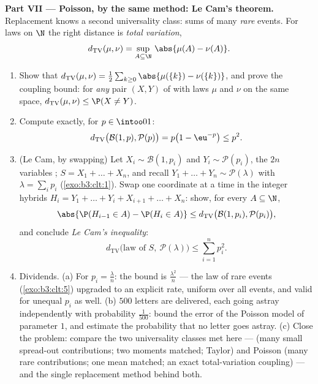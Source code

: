 \begin{problem}
\medskip
\noindent\textbf{Part VII --- Poisson, by the same method:
Le Cam's theorem.} Replacement knows a second universality
class: sums of many  \emph{rare} events. For
laws on $\N$ the right distance is \emph{total variation},
\[
d_{\mathrm{TV}}(\mu, \nu) = \sup_{A\subseteq\N}\,
\abs{\mu(A) - \nu(A)} .
\]
\begin{enumerate}[resume]
  \item Show that $d_{\mathrm{TV}}(\mu, \nu) =
        \frac12\sum_{k\geq0}\abs{\mu(\{k\}) -
        \nu(\{k\})}$, and prove the coupling bound: for
        \emph{any} pair $(X, Y)$ of  with
        laws $\mu$ and $\nu$ on the same space,
        $d_{\mathrm{TV}}(\mu, \nu) \leq \P(X \neq Y)$.
  \item Compute exactly, for $p \in \intoo01$:
        \[
        d_{\mathrm{TV}}\bigl(\mathcal B(1, p), \mathcal
        P(p)\bigr) = p\bigl(1 - \eu^{-p}\bigr) \leq p^2 .
        \]
  \item (Le Cam, by swapping) Let $X_i \sim \mathcal B(1,
        p_i)$ and $Y_i \sim \mathcal P(p_i)$, the $2n$
        variables ; $S = X_1 + \dots + X_n$, and
        recall $Y_1 + \dots + Y_n \sim \mathcal P(\lambda)$
        with $\lambda = \sum_ip_i$ (\cref{exo:b3:clt:1}).
        Swap one coordinate at a time in the integer
        hybrids $H_i = Y_1 + \dots + Y_i + X_{i+1} + \dots
        + X_n$: show, for every $A \subseteq \N$,
        \[
        \abs{\P(H_{i-1} \in A) - \P(H_i \in A)} \leq
        d_{\mathrm{TV}}\bigl(\mathcal B(1, p_i), \mathcal
        P(p_i)\bigr),
        \]
        and conclude \emph{Le Cam's inequality}:
        \[
        d_{\mathrm{TV}}\bigl(\text{law of } S,\ \mathcal
        P(\lambda)\bigr) \leq \sum_{i=1}^np_i^2 .
        \]
  \item Dividends. (a) For $p_i = \frac\lambda n$: the
        bound is $\frac{\lambda^2}n$ --- the law of rare
        events (\cref{exo:b3:clt:5}) upgraded to an
        explicit rate, uniform over all events, and valid
        for unequal $p_i$ as well. (b) $500$ letters are
        delivered, each going astray independently with
        probability $\frac1{500}$: bound the error of the
        Poisson model of parameter $1$, and estimate the
        probability that no letter goes astray. (c) Close
        the problem: compare the two universality classes
        met here ---  (many small spread-out
        contributions; two moments matched; Taylor) and
        Poisson (many rare contributions; one mean
        matched; an exact total-variation coupling) --- and
        the single replacement method behind both.


\end{enumerate}
\end{problem}
